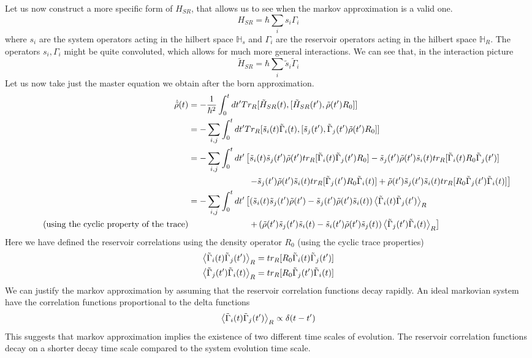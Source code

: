\documentclass{scrartcl}
\newcommand{\1}{\mathbbm{1}}
\newcommand{\irho}{\tilde{\rho}}
\newcommand{\ihsr}{\tilde{H}_{SR}}
\newcommand{\G}{\Gamma}
\newcommand{\iG}{\tilde{\Gamma}}
\newcommand{\is}{\tilde{s}}
\newcommand{\h}{\mathbb{H}}
\begin{document}
Let us now construct a more specific form of $H_{SR}$, that allows us to see when the markov approximation is a valid one.
\[ H_{SR} = \hbar \sum_i s_i \G_i \]
where $s_i$ are the system operators acting in the hilbert space $\h_s$ and $\G_i$ are the reservoir operators 
acting in the hilbert space $\h_R$. The operators $s_i, \G_i$ might be quite convoluted,
which allows for much more general interactions. We can see that, in the interaction picture
 \[\ihsr = \hbar \sum_i \is_i \iG_i\]
Let us now take just the master equation we obtain after the born approximation. 
\begin{align*}
    \dot{\tilde{\rho}}(t) &= -\frac{1}{\hbar^2} \int_0^t dt' Tr_R[\tilde{H}_{SR}(t), [\tilde{H}_{SR}(t'), \tilde{\rho}(t')R_0]] \\ 
    & = - \sum_{i,j} \int_0^t dt' Tr_R[\is_i(t) \iG_i(t), [\is_j(t'), \iG_j(t') \tilde{\rho}(t')R_0]]\\ 
    & = - \sum_{i,j} \int_0^t dt' \left[ \is_i(t)\is_j(t')\irho(t') tr_R[\iG_i(t)\iG_j(t')R_0] - \is_j(t')\irho(t')\is_i(t) tr_R[\iG_i(t)R_0\iG_j(t')] \right. \\ 
    & \hspace{7em}\left.- \is_j(t')\irho(t') \is_i(t)tr_R[\iG_j(t')R_0\iG_i(t)] + \irho(t')\is_j(t')\is_i(t) tr_R[R_0\iG_j(t')\iG_i(t)] \right] \\ 
    & = -\sum_{i,j} \int_0^t dt' \left[ \left( \is_i(t)\is_j(t')\irho(t') -\is_j(t')\irho(t')\is_i(t) \right) \expval{\iG_i(t)\iG_j(t')}_R \right. \\ 
    \tag{using the cyclic property of the trace}
    & \hspace{7em}\left. + \left( \irho(t')\is_j(t')\is_i(t) - \is_i(t')\irho(t')\is_j(t) \right) \expval{\iG_j(t')\iG_i(t)}_R \right] 
\end{align*}
Here we have defined the reservoir correlations using the density operator $R_0$ (using the cyclic trace properties)
\begin{align}
    \expval{\iG_i(t)\iG_j(t')}_R &= tr_R[R_0 \iG_i(t)\iG_j(t')] \\
    \expval{\iG_j(t')\iG_i(t)}_R &= tr_R[R_0 \iG_j(t')\iG_i(t)]
\end{align}
We can justify the markov approximation by assuming that the reservoir correlation functions decay rapidly. An ideal markovian
system have the correlation functions proportional to the delta functions
\begin{align*}
    \expval{\iG_i(t)\iG_j(t')}_R \propto \delta(t-t')
\end{align*}
This suggests that markov approximation implies the existence of two different time scales of evolution. The
reservoir correlation functions decay on a shorter decay time scale compared to the system evolution time scale.
\end{document}

